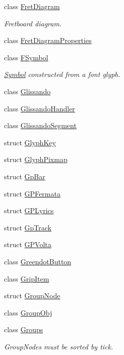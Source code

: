\begin{DoxyCompactItemize}
\item 
class \hyperlink{class_ms_1_1_fret_diagram}{Fret\+Diagram}
\begin{DoxyCompactList}\small\item\em Fretboard diagram. \end{DoxyCompactList}\item 
class \hyperlink{class_ms_1_1_fret_diagram_properties}{Fret\+Diagram\+Properties}
\item 
class \hyperlink{class_ms_1_1_f_symbol}{F\+Symbol}
\begin{DoxyCompactList}\small\item\em \hyperlink{class_ms_1_1_symbol}{Symbol} constructed from a font glyph. \end{DoxyCompactList}\item 
class \hyperlink{class_ms_1_1_glissando}{Glissando}
\item 
class \hyperlink{class_ms_1_1_glissando_handler}{Glissando\+Handler}
\item 
class \hyperlink{class_ms_1_1_glissando_segment}{Glissando\+Segment}
\item 
struct \hyperlink{struct_ms_1_1_glyph_key}{Glyph\+Key}
\item 
struct \hyperlink{struct_ms_1_1_glyph_pixmap}{Glyph\+Pixmap}
\item 
struct \hyperlink{struct_ms_1_1_gp_bar}{Gp\+Bar}
\item 
struct \hyperlink{struct_ms_1_1_g_p_fermata}{G\+P\+Fermata}
\item 
struct \hyperlink{struct_ms_1_1_g_p_lyrics}{G\+P\+Lyrics}
\item 
struct \hyperlink{struct_ms_1_1_gp_track}{Gp\+Track}
\item 
struct \hyperlink{struct_ms_1_1_g_p_volta}{G\+P\+Volta}
\item 
class \hyperlink{class_ms_1_1_greendot_button}{Greendot\+Button}
\item 
class \hyperlink{class_ms_1_1_grip_item}{Grip\+Item}
\item 
struct \hyperlink{struct_ms_1_1_group_node}{Group\+Node}
\item 
class \hyperlink{class_ms_1_1_group_obj}{Group\+Obj}
\item 
class \hyperlink{class_ms_1_1_groups}{Groups}
\begin{DoxyCompactList}\small\item\em Group\+Nodes must be sorted by tick. \end{DoxyCompactList}\item 

\end{DoxyCompactItemize}
